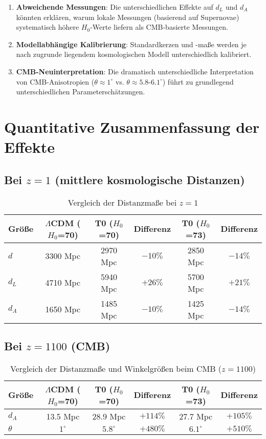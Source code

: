 \documentclass[a4paper,12pt]{article}
\theoremstyle{definition}
\theoremstyle{remark}
\begin{document}
	\begin{enumerate}
		\item \textbf{Abweichende Messungen}: Die unterschiedlichen Effekte auf $d_L$ und $d_A$ könnten erklären, warum lokale Messungen (basierend auf Supernovae) systematisch höhere $H_0$-Werte liefern als CMB-basierte Messungen.
		\item \textbf{Modellabhängige Kalibrierung}: Standardkerzen und -maße werden je nach zugrunde liegendem kosmologischen Modell unterschiedlich kalibriert.
		\item \textbf{CMB-Neuinterpretation}: Die dramatisch unterschiedliche Interpretation von CMB-Anisotropien ($\theta \approx 1^\circ$ vs. $\theta \approx 5.8$-$6.1^\circ$) führt zu grundlegend unterschiedlichen Parameterschätzungen.
	\end{enumerate}
	
	\section{Quantitative Zusammenfassung der Effekte}
	
	\subsection{Bei $z = 1$ (mittlere kosmologische Distanzen)}
	
	\begin{table}[h]
		\centering
		\begin{tabular}{|l|c|c|c|c|c|}
			\hline
			\textbf{Größe} & \textbf{\(\Lambda\)CDM ($H_0$=70)} & \textbf{T0 ($H_0$=70)} & \textbf{Differenz} & \textbf{T0 ($H_0$=73)} & \textbf{Differenz} \\
			\hline
			$d$ & 3300 Mpc & 2970 Mpc & $-10\%$ & 2850 Mpc & $-14\%$ \\
			$d_L$ & 4710 Mpc & 5940 Mpc & $+26\%$ & 5700 Mpc & $+21\%$ \\
			$d_A$ & 1650 Mpc & 1485 Mpc & $-10\%$ & 1425 Mpc & $-14\%$ \\
			\hline
		\end{tabular}
		\caption{Vergleich der Distanzmaße bei $z = 1$}
	\end{table}
	
	\subsection{Bei $z = 1100$ (CMB)}
	
	\begin{table}[h]
		\centering
		\begin{tabular}{|l|c|c|c|c|c|}
			\hline
			\textbf{Größe} & \textbf{\(\Lambda\)CDM ($H_0$=70)} & \textbf{T0 ($H_0$=70)} & \textbf{Differenz} & \textbf{T0 ($H_0$=73)} & \textbf{Differenz} \\
			\hline
			$d_A$ & 13.5 Mpc & 28.9 Mpc & $+114\%$ & 27.7 Mpc & $+105\%$ \\
			$\theta$ & $1^\circ$ & $5.8^\circ$ & $+480\%$ & $6.1^\circ$ & $+510\%$ \\
			\hline
		\end{tabular}
		\caption{Vergleich der Distanzmaße und Winkelgrößen beim CMB ($z = 1100$)}
	\end{table}
	
\end{document}
